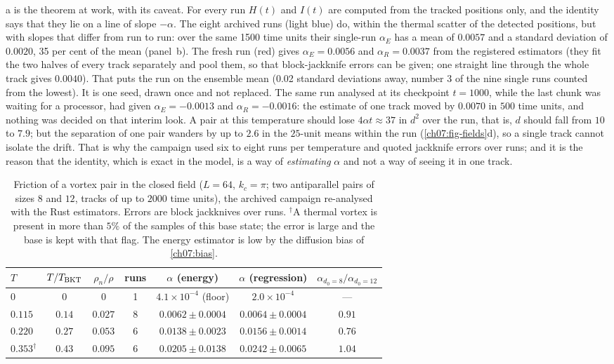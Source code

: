 a is the theorem at work, with its caveat. For every run $H(t)$ and $I(t)$ are computed from the tracked positions only, and the identity says that they lie on a line of slope $-\alpha$. The eight archived runs (light blue) do, within the thermal scatter of the detected positions, but with slopes that differ from run to run: over the same
1500 time units their single-run $\alpha_E$ has a mean of $0.0057$ and a standard deviation of $0.0020$, 35 per cent of the mean (panel~b). The fresh run (red) gives $\alpha_E=0.0056$ and $\alpha_R=0.0037$ from the registered estimators (they fit the two halves of every track separately and pool them, so that block-jackknife errors can be given; one straight line through the whole track gives $0.0040$). That puts the run on the ensemble mean (0.02 standard deviations away, number 3 of the nine single runs counted from the lowest).
It is one seed, drawn once and not replaced. The same run analysed at its checkpoint $t=1000$, while the last chunk was waiting for a processor, had given $\alpha_E=-0.0013$ and $\alpha_R=-0.0016$: the estimate of one track moved by $0.0070$ in $500$ time units, and nothing was decided on that interim look.
A pair at this temperature should lose $4\alpha t\approx37$ in $d^2$ over the run, that is, $d$ should fall from $10$ to $7.9$; but the separation of one pair wanders by up to $2.6$ in the $25$-unit means within the run (\cref{ch07:fig-fields}d), so a single track cannot isolate the drift. That is why the campaign used six to eight runs per temperature and quoted jackknife errors over runs; and it is the reason that the identity,
which is exact in the model, is a way of \emph{estimating} $\alpha$ and not a way of seeing it in one track.

\begin{table}[!tb]\centering\small
\begin{tabular}{lcccccc}
\toprule
$T$ & $T/T_{\rm BKT}$ & $\rho_n/\rho$ & runs & $\alpha$ (energy) & $\alpha$ (regression) & $\alpha_{d_0=8}/\alpha_{d_0=12}$\\
\midrule
$0$ & $0$ & $0$ & 1 & $4.1\times10^{-4}$ (floor) & $2.0\times10^{-4}$ & ---\\
$0.115$ & $0.14$ & $0.027$ & $8$ & $0.0062\pm0.0004$ & $0.0064\pm0.0004$ & $0.91$\\
$0.220$ & $0.27$ & $0.053$ & $6$ & $0.0138\pm0.0023$ & $0.0156\pm0.0014$ & $0.76$\\
$0.353^{\dagger}$ & $0.43$ & $0.095$ & $6$ & $0.0205\pm0.0138$ & $0.0242\pm0.0065$ & $1.04$\\
\bottomrule
\end{tabular}
\caption{Friction of a vortex pair in the closed field ($L=64$, $k_c=\pi$; two antiparallel pairs of sizes $8$ and $12$, tracks of up to $2000$ time units), the archived campaign re-analysed with the Rust estimators. Errors are block jackknives over runs.
$^\dagger$A thermal vortex is present in more than $5\%$ of the samples of this base state; the error is large and the base is kept with that flag. The energy estimator is low by the diffusion bias of \cref{ch07:bias}.}
\label{ch07:tab-alpha}
\end{table}

